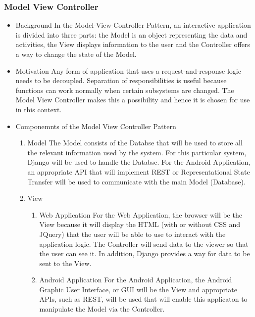 \documentclass[a4paper,12pt]{article}
\begin{document}
\subsubsection{Model View Controller}
\begin{itemize}
\item{Background}
\newline
\newline
In the Model-View-Controller Pattern, an interactive application is divided into three parts: the Model is an object representing the data and activities, the View displays information to the user and the Controller offers a way to change the state of the Model.

\item{Motivation}
\newline
\newline
Any form of application that uses a request-and-response logic needs to be decoupled. Separation of responsibilities is useful because functions can work normally when certain subsystems are changed. The Model View Controller makes this a possibility and hence it is chosen for use in this context. 

\item{Componemnts of the Model View Controller Pattern}
\begin{enumerate}
\item{Model}
\newline
The Model consists of the Databse that will be used to store all the relevant information used by the system. For this particular system, Django will be used to handle the Databse. For the Android Application, an appropriate API that will implement REST or Representational State Transfer will be used to communicate with the main Model (Database).
\newline

\item{View}
\begin{enumerate}
\item{Web Application}
\newline
For the Web Application, the browser will be the View because it will display the HTML (with or without CSS and JQuery) that the user will be able to use to interact with the application logic. The Controller will send data to the viewer so that the user can see it. In addition, Django provides a way for data to be sent to the View.
\newline
\item{Android Application}
\newline
For the Android Application, the Android Graphic User Interface, or GUI will be the View and appropriate APIs, such as REST, will be used that will enable this applicaton to manipulate the Model via the Controller.
\end{enumerate}


\end{enumerate}
\end{itemize}
\end{document}
